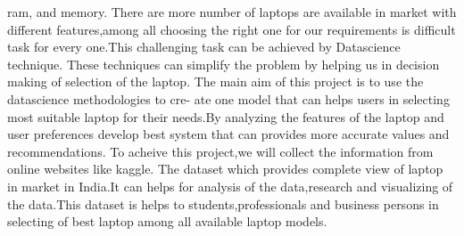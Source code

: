 ram, and memory. There are more number of laptops are available in market with different features,among all
choosing the right one for our requirements is difficult task for every one.This challenging task can be achieved
by Datascience technique.
These techniques can simplify the problem by helping us in decision making of selection of the laptop. The
main aim of this project is to use the datascience methodologies to cre- ate one model that can helps users
in selecting most suitable laptop for their needs.By analyzing the features of the laptop and user preferences
develop best system that can provides more accurate values and recommendations. To acheive this project,we
will collect the information from online websites like kaggle. The dataset which provides complete view of
laptop in market in India.It can helps for analysis of the data,research and visualizing of the data.This dataset is helps to students,professionals and business persons in selecting of best laptop among all available laptop models.

